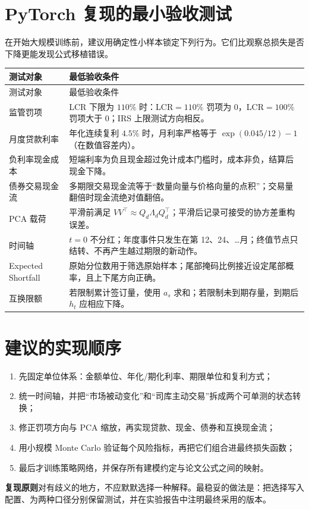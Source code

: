 \documentclass[UTF8,11pt,a4paper,fontset=fandol]{ctexart}
\begin{document}
\section{PyTorch 复现的最小验收测试}
\label{sec:tests}

在开始大规模训练前，建议用确定性小样本锁定下列行为。它们比观察总损失是否下降更能发现公式移植错误。

\begin{longtable}{@{}p{36mm}p{106mm}@{}}
\toprule
测试对象 & 最低验收条件 \\
\midrule
\endfirsthead
\toprule
测试对象 & 最低验收条件 \\
\midrule
\endhead
监管罚项 & LCR 下限为 $110\%$ 时：LCR$=110\%$ 罚项为 0，LCR$=100\%$ 罚项大于 0；IRS 上限测试方向相反。 \\
月度贷款利率 & 年化连续复利 $4.5\%$ 时，月利率严格等于 $\exp(0.045/12)-1$（在数值容差内）。 \\
负利率现金成本 & 短端利率为负且现金超过免计成本门槛时，成本非负，结算后现金下降。 \\
债券交易现金流 & 多期限交易现金流等于“数量向量与价格向量的点积”；交易量翻倍时现金流绝对值翻倍。 \\
PCA 载荷 & 平滑前满足 $VV^\top\approx Q_d\Lambda_dQ_d^\top$；平滑后记录可接受的协方差重构误差。 \\
时间轴 & $t=0$ 不分红；年度事件只发生在第 12、24、\ldots 月；终值节点只结转、不再产生越过期限的新动作。 \\
Expected Shortfall & 原始分位数用于筛选原始样本；尾部掩码比例接近设定尾部概率，且上下尾方向正确。 \\
互换限额 & 若限制累计签订量，使用 $a_s$ 求和；若限制未到期存量，到期后 $h_t$ 应相应下降。 \\
\bottomrule
\end{longtable}

\section{建议的实现顺序}

\begin{enumerate}
  \item 先固定单位体系：金额单位、年化/期化利率、期限单位和复利方式；
  \item 统一时间轴，并把“市场被动变化”和“司库主动交易”拆成两个可单测的状态转换；
  \item 修正罚项方向与 PCA 缩放，再实现贷款、现金、债券和互换现金流；
  \item 用小规模 Monte Carlo 验证每个风险指标，再把它们组合进最终损失函数；
  \item 最后才训练策略网络，并保存所有建模约定与论文公式之间的映射。
\end{enumerate}

\begin{summarybox}
\textbf{复现原则}\quad 对有歧义的地方，不应默默选择一种解释。最稳妥的做法是：把选择写入配置、为两种口径分别保留测试，并在实验报告中注明最终采用的版本。
\end{summarybox}

\vfill
{}
\end{document}
